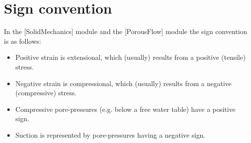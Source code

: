 \section{Sign convention}
\label{chap:sign-convention}


In the [SolidMechanics] module and the [PorousFlow] module the sign convention
is as follows:

\begin{itemize}
      \item Positive strain is extensional, which (usually) results from a positive
            (tensile) stress.
      \item Negative strain is compressional, which (usually) results from a negative
            (compressive) stress.
      \item Compressive pore-pressures (e.g. below a free water table) have a positive
            sign.
      \item Suction is represented by pore-pressures having a negative sign.
\end{itemize}
